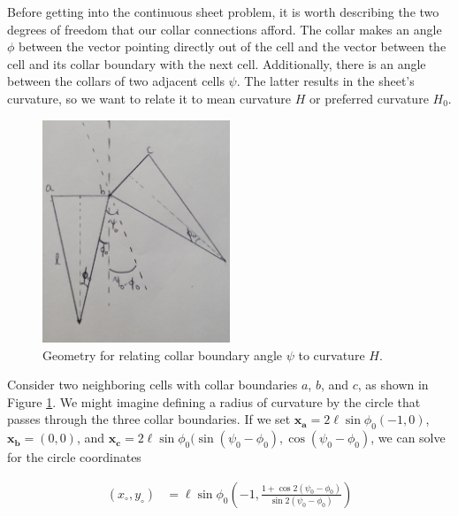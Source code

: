 Before getting into the continuous sheet problem, it is worth describing the two degrees of freedom that our collar connections afford. The collar makes an angle $\phi$ between the vector pointing directly out of the cell and the vector between the cell and its collar boundary with the next cell. Additionally, there is an angle between the collars of two adjacent cells $\psi$. The latter results in the sheet's curvature, so we want to relate it to mean curvature $H$ or preferred curvature $H_0$. 


\begin{figure}[htbp]
    \centering
    \includegraphics[width=0.5\textwidth]{hpsi.jpg}
    \caption[Geometry of sheet curvature]{Geometry for relating collar boundary angle $\psi$ to curvature $H$. }
    \label{fig:hpsi}
\end{figure}

Consider two neighboring cells with collar boundaries $a$, $b$, and $c$, as shown in Figure \ref{fig:hpsi}. We might imagine defining a radius of curvature by the circle that passes through the three collar boundaries. If we set $\bm{x_a} = 2\ell\sin\phi_0(-1, 0)$, $\bm{x_b} = (0,0)$, and $\bm{x_c} = 2\ell\sin\phi_0 (\sin(\psi_0 - \phi_0), \cos(\psi_0-\phi_0)$, we can solve for the circle coordinates 

\begin{align*}
    (x_\circ, y_\circ) &= \ell \sin\phi_0\left(-1, \frac{1+\cos2(\psi_0 - \phi_0)}{\sin2(\psi_0 - \phi_0)} \right)
\end{align*}


